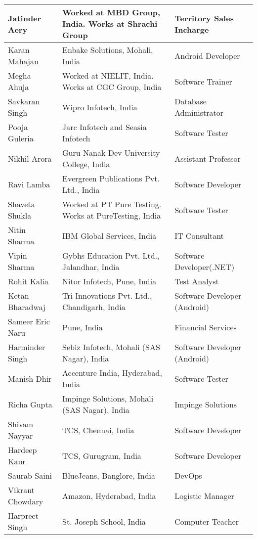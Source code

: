 \documentclass[margin,line]{res}
\begin{document}
\begin{resume}
\begin{center}
\begin{tabular}{ | p{3.5cm} | p{5.70cm} | l | }
    \hline    
    Jatinder Aery & Worked at MBD Group, India. Works at Shrachi Group & Territory Sales Incharge\\
    \hline    
    Karan Mahajan & Enbake Solutions, Mohali, India & Android Developer\\
    \hline
    Megha Ahuja & Worked at NIELIT, India. Works at CGC Group, India & Software Trainer\\
    \hline
    Savkaran Singh & Wipro Infotech, India & Database Administrator\\
    \hline
    Pooja Guleria & Jarc Infotech and Seasia Infotech & Software Tester\\
    \hline
    Nikhil Arora & Guru Nanak Dev University College, India & Assistant Professor\\
    \hline
    Ravi Lamba & Evergreen Publications Pvt. Ltd., India & Software Developer\\
    \hline
    Shaveta Shukla & Worked at PT Pure Testing. Works at PureTesting, India & Software Tester\\
    \hline 
    Nitin Sharma & IBM Global Services, India & IT Consultant\\
    \hline
    Vipin Sharma & Gybhs Education Pvt. Ltd., Jalandhar, India & Software Developer(.NET)\\
    \hline
    Rohit Kalia & Nitor Infotech, Pune, India & Test Analyst\\
    \hline
    Ketan Bharadwaj & Tri Innovations Pvt. Ltd., Chandigarh, India & Software Developer (Android)\\
    \hline
    Sameer Eric Naru & Pune, India & Financial Services\\
    \hline
    Harminder Singh & Sebiz Infotech, Mohali (SAS Nagar), India & Software Developer (Android)\\
    \hline
    Manish Dhir & Accenture India, Hyderabad, India & Software Tester\\
    \hline
    Richa Gupta & Impinge Solutions,  Mohali (SAS Nagar), India & Impinge Solutions\\
    \hline
    Shivam Nayyar & TCS, Chennai, India & Software Developer\\
    \hline
	Hardeep Kaur & TCS, Gurugram, India & Software Developer\\
	\hline
	Saurab Saini & BlueJeans, Banglore, India & DevOps\\
	\hline
	Vikrant Chowdary & Amazon, Hyderabad, India & Logistic Manager\\
	\hline
	Harpreet Singh & St. Joseph School, India & Computer Teacher\\
	\hline    
	\end{tabular}

\end{center}

\end{resume}
\end{document}

